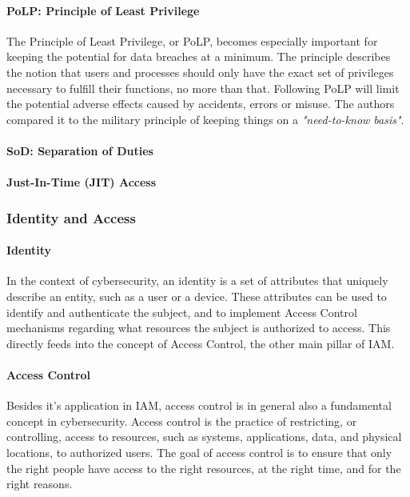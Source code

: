 \paragraph{PoLP: Principle of Least Privilege}
The Principle of Least Privilege, or PoLP, becomes especially important for keeping the potential for data breaches at a minimum. The principle describes the notion that users and processes should only have the exact set of privileges necessary to fulfill their functions, no more than that\citep{OGDef-PoLP}. Following PoLP will limit the potential adverse effects caused by accidents, errors or misuse. The authors compared it to the military principle of keeping things on a \textit{"need-to-know basis"}\citep{OGDef-PoLP}.
\paragraph{SoD: Separation of Duties}
\paragraph{Just-In-Time (JIT) Access}

\subsubsection{Identity and Access}
\paragraph{Identity}
In the context of cybersecurity, an identity is a set of attributes that uniquely describe an entity, such as a user or a device. These attributes can be used to identify and authenticate the subject, and to implement Access Control mechanisms regarding what resources the subject is authorized to access\citep{Gartner-DefIAM}. This directly feeds into the concept of Access Control, the other main pillar of IAM.
\paragraph{Access Control}
Besides it's application in IAM, access control is in general also a fundamental concept in cybersecurity. Access control is the practice of restricting, or controlling, access to resources, such as systems, applications, data, and physical locations, to authorized users. The goal of access control is to ensure that only the right people have access to the right resources, at the right time, and for the right reasons\citep{Gartner-DefIAM}.


